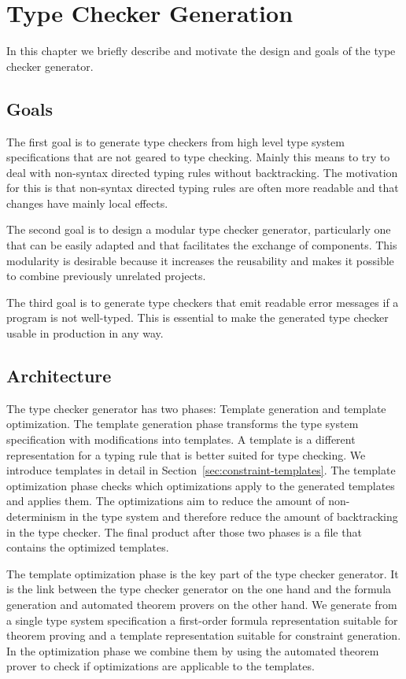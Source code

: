 \chapter{Type Checker Generation}
\label{cha:type-check-gener}
In this chapter we briefly describe and motivate the design and goals
of the type checker generator.

\section{Goals}
\label{sec:goals}
The first goal is to generate type checkers from high level type
system specifications that are not geared to type checking. Mainly
this means to try to deal with non-syntax directed typing rules
without backtracking. The motivation for this is that non-syntax
directed typing rules are often more readable and that changes have
mainly local effects. 

The second goal is to design a modular type checker generator,
particularly one that can be easily adapted and that facilitates the
exchange of components. This modularity is desirable because it
increases the reusability and makes it possible to combine previously
unrelated projects.

The third goal is to generate type checkers that emit readable error
messages if a program is not well-typed. This is essential to make the
generated type checker usable in production in any way.
\section{Architecture}
\label{sec:architecture}
The type checker generator has two phases: Template generation and
template optimization. The template generation phase transforms the
type system specification with modifications into templates. A
template is a different representation for a typing rule that is
better suited for type checking. We introduce templates in detail in
Section~\ref{sec:constraint-templates}. The template optimization
phase checks which optimizations apply to the generated templates and
applies them. The optimizations aim to reduce the amount of
non-determinism in the type system and therefore reduce the amount of
backtracking in the type checker. The final product after those two
phases is a file that contains the optimized templates.

The template optimization phase is the key part of the type checker
generator. It is the link between the type checker generator on the
one hand and the formula generation and automated theorem provers on
the other hand. We generate from a single type system specification a
first-order formula representation suitable for theorem proving and a
template representation suitable for constraint generation. In the
optimization phase we combine them by using the automated theorem
prover to check if optimizations are applicable to the templates.

